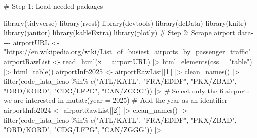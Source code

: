 \documentclass[
  letterpaper,
  DIV=11,
  numbers=noendperiod]{scrartcl}
\newenvironment{Shaded}{\begin{snugshade}}{\end{snugshade}}
\newcommand{\AttributeTok}[1]{\textcolor[rgb]{0.40,0.45,0.13}{#1}}
\newcommand{\CommentTok}[1]{\textcolor[rgb]{0.37,0.37,0.37}{#1}}
\newcommand{\DecValTok}[1]{\textcolor[rgb]{0.68,0.00,0.00}{#1}}
\newcommand{\FunctionTok}[1]{\textcolor[rgb]{0.28,0.35,0.67}{#1}}
\newcommand{\NormalTok}[1]{\textcolor[rgb]{0.00,0.23,0.31}{#1}}
\newcommand{\OtherTok}[1]{\textcolor[rgb]{0.00,0.23,0.31}{#1}}
\newcommand{\SpecialCharTok}[1]{\textcolor[rgb]{0.37,0.37,0.37}{#1}}
\newcommand{\StringTok}[1]{\textcolor[rgb]{0.13,0.47,0.30}{#1}}
\begin{document}
\begin{Shaded}
\begin{Highlighting}[]
\CommentTok{\# Step 1: Load needed packages{-}{-}{-}{-}}

\FunctionTok{library}\NormalTok{(tidyverse)}
\FunctionTok{library}\NormalTok{(rvest)}
\FunctionTok{library}\NormalTok{(devtools)}
\FunctionTok{library}\NormalTok{(dcData)}
\FunctionTok{library}\NormalTok{(knitr)}
\FunctionTok{library}\NormalTok{(janitor)}
\FunctionTok{library}\NormalTok{(kableExtra)}
\FunctionTok{library}\NormalTok{(plotly)}
\CommentTok{\# Step 2: Scrape airport data{-}{-}{-}{-}}
\NormalTok{airportURL }\OtherTok{\textless{}{-}} \StringTok{"https://en.wikipedia.org/wiki/List\_of\_busiest\_airports\_by\_passenger\_traffic"}
\NormalTok{airportRawList }\OtherTok{\textless{}{-}} \FunctionTok{read\_html}\NormalTok{(}\AttributeTok{x =}\NormalTok{ airportURL) }\SpecialCharTok{|\textgreater{}}
  \FunctionTok{html\_elements}\NormalTok{(}\AttributeTok{css =} \StringTok{"table"}\NormalTok{) }\SpecialCharTok{|\textgreater{}}
  \FunctionTok{html\_table}\NormalTok{() }
\NormalTok{airportInfo2025 }\OtherTok{\textless{}{-}}\NormalTok{ airportRawList[[}\DecValTok{1}\NormalTok{]] }\SpecialCharTok{|\textgreater{}} 
  \FunctionTok{clean\_names}\NormalTok{() }\SpecialCharTok{|\textgreater{}}
  \FunctionTok{filter}\NormalTok{(}\StringTok{\textasciigrave{}}\AttributeTok{code\_iata\_icao}\StringTok{\textasciigrave{}} \SpecialCharTok{\%in\%} \FunctionTok{c}\NormalTok{(}\StringTok{"ATL/KATL"}\NormalTok{, }\StringTok{"FRA/EDDF"}\NormalTok{, }\StringTok{"PKX/ZBAD"}\NormalTok{,}
                                 \StringTok{"ORD/KORD"}\NormalTok{, }\StringTok{"CDG/LFPG"}\NormalTok{, }\StringTok{"CAN/ZGGG"}\NormalTok{)) }\SpecialCharTok{|\textgreater{}} 
  \CommentTok{\# Select only the 6 airports we are interested in}
  \FunctionTok{mutate}\NormalTok{(}\AttributeTok{year =} \DecValTok{2025}\NormalTok{) }\CommentTok{\# Add the year as an identifier}
\NormalTok{airportInfo2024 }\OtherTok{\textless{}{-}}\NormalTok{ airportRawList[[}\DecValTok{2}\NormalTok{]] }\SpecialCharTok{|\textgreater{}}
  \FunctionTok{clean\_names}\NormalTok{() }\SpecialCharTok{|\textgreater{}}
  \FunctionTok{filter}\NormalTok{(}\StringTok{\textasciigrave{}}\AttributeTok{code\_iata\_icao}\StringTok{\textasciigrave{}} \SpecialCharTok{\%in\%} \FunctionTok{c}\NormalTok{(}\StringTok{"ATL/KATL"}\NormalTok{, }\StringTok{"FRA/EDDF"}\NormalTok{, }\StringTok{"PKX/ZBAD"}\NormalTok{,}
                                 \StringTok{"ORD/KORD"}\NormalTok{, }\StringTok{"CDG/LFPG"}\NormalTok{, }\StringTok{"CAN/ZGGG"}\NormalTok{)) }\SpecialCharTok{|\textgreater{}} 

\end{Highlighting}
\end{Shaded}
\end{document}
